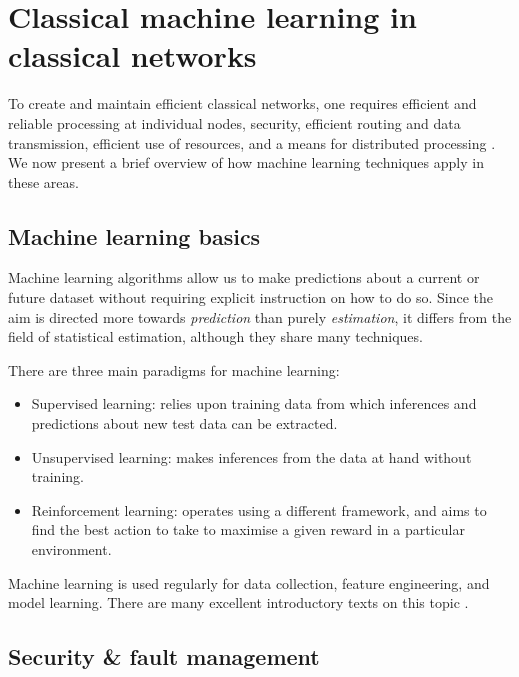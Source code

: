 \documentclass[twocolumn, aps, rmp, amsmath, amssymb, nofootinbib, superscriptaddress, longbibliography, floatfix, table-of-contents, eqsecnum]{revtex4}
\begin{document}
\section{Classical machine learning in classical networks}

To create and maintain efficient classical networks, one requires efficient and reliable processing at individual nodes, security, efficient routing and data transmission, efficient use of resources, and a means for distributed processing \cite{bib:boutaba2018comprehensive, bib:wang2018machine}. We now present a brief overview of how machine learning techniques apply in these areas. 

\subsection{Machine learning basics}

Machine learning algorithms allow us to make predictions about a current or future dataset without requiring explicit instruction on how to do so. Since the aim is directed more towards \textit{prediction} than purely \textit{estimation}, it differs from the field of statistical estimation, although they share many techniques.

There are three main paradigms for machine learning:
\begin{itemize}
	\item Supervised learning: relies upon training data from which inferences and predictions about new test data can be extracted.
	\item Unsupervised learning: makes inferences from the data at hand without training.
	\item Reinforcement learning: operates using a different framework, and aims to find the best action to take to maximise a given reward in a particular environment.
\end{itemize}

Machine learning is used regularly for data collection, feature engineering, and model learning. There are many excellent introductory texts on this topic \cite{bib:bishop2006pattern, bib:shalev2014understanding, bib:trevor2009elements, bib:marsland2011machine, bib:flach2012machine}.

\subsection{Security \& fault management}
\end{document}
